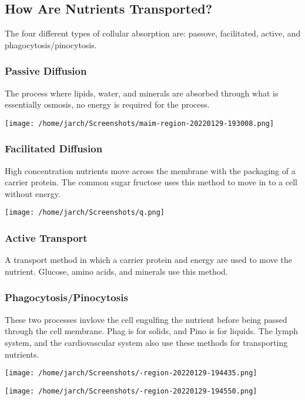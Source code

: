 \documentclass[letterpaper, 11pt]{article}
\begin{document}
\subsection{How Are Nutrients Transported?}
\label{sec:orgc14199a}
The four different types of collular absorption are: passove, facilitated, active, and phagocytosis/pinocytosis.\\
\subsubsection{Passive Diffusion}
\label{sec:orgf494bc0}
The process where lipids, water, and minerals are absorbed through what is essentially osmosis, no energy is required for the process.\\
\begin{center}
\texttt{[image: /home/jarch/Screenshots/maim-region-20220129-193008.png]}
\end{center}
\subsubsection{Facilitated Diffusion}
\label{sec:orge211576}
High concentration nutrients move across the membrane with the packaging of a carrier protein. The common sugar fructose uses this method to move in to a cell without energy.\\
\begin{center}
\texttt{[image: /home/jarch/Screenshots/q.png]}
\end{center}
\subsubsection{Active Transport}
\label{sec:org1e8fe03}
A transport method in which a carrier protein and energy are used to move the nutrient. Glucose, amino acids, and minerals use this method.\\
\subsubsection{Phagocytosis/Pinocytosis}
\label{sec:orgb6d9478}
These two processes invlove the cell engulfing the nutrient before being passed through the cell membrane. Phag is for solids, and Pino is for liquids. The lymph system, and the cardiovascular system also use these methods for transporting nutrients.\\
\begin{center}
\texttt{[image: /home/jarch/Screenshots/-region-20220129-194435.png]}
\end{center}
\begin{center}
\texttt{[image: /home/jarch/Screenshots/-region-20220129-194550.png]}
\end{center}
\end{document}
